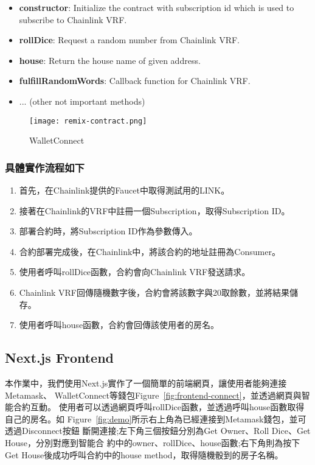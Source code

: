 \begin{itemize}
  \item \textbf{constructor}: Initialize the contract with subscription id
  which is used to subscribe to Chainlink VRF. 
  \item \textbf{rollDice}: Request a random number from Chainlink VRF.
  \item \textbf{house}: Return the house name of given address.
  \item \textbf{fulfillRandomWords}: Callback function for Chainlink VRF.
  \item ... (other not important methods)
\end{itemize}

\begin{figure}[H]
    \centering
    \texttt{[image: remix-contract.png]}
    \caption{WalletConnect}
    \label{fig:remix-contract}
\end{figure}


\subsubsection{具體實作流程如下}

\begin{enumerate}
  \item 首先，在Chainlink提供的Faucet中取得測試用的LINK。
  \item 接著在Chainlink的VRF中註冊一個Subscription，取得Subscription ID。
  \item 部署合約時，將Subscription ID作為參數傳入。
  \item 合約部署完成後，在Chainlink中，將該合約的地址註冊為Consumer。
  \item 使用者呼叫rollDice函數，合約會向Chainlink VRF發送請求。
  \item Chainlink VRF回傳隨機數字後，合約會將該數字與20取餘數，並將結果儲存。
  \item 使用者呼叫house函數，合約會回傳該使用者的房名。
\end{enumerate}

\subsection{Next.js Frontend}

本作業中，我們使用Next.js實作了一個簡單的前端網頁，讓使用者能夠連接Metamask、
WalletConnect等錢包Figure~\ref{fig:frontend-connect}，並透過網頁與智能合約互動。
使用者可以透過網頁呼叫rollDice函數，並透過呼叫house函數取得自己的房名。如
Figure~\ref{fig:demo}所示右上角為已經連接到Metamask錢包，並可透過Disconnect按鈕
斷開連接;左下角三個按鈕分別為Get Owner、Roll Dice、Get House，分別對應到智能合
約中的owner、rollDice、house函數;右下角則為按下Get House後成功呼叫合約中的house
method，取得隨機骰到的房子名稱。

